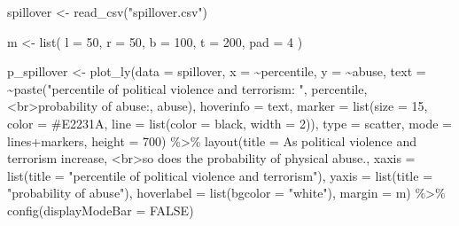 \documentclass[
  letterpaper,
  DIV=11,
  numbers=noendperiod]{scrartcl}
\newenvironment{Shaded}{\begin{snugshade}}{\end{snugshade}}
\newcommand{\AttributeTok}[1]{\textcolor[rgb]{0.40,0.45,0.13}{#1}}
\newcommand{\ConstantTok}[1]{\textcolor[rgb]{0.56,0.35,0.01}{#1}}
\newcommand{\DecValTok}[1]{\textcolor[rgb]{0.68,0.00,0.00}{#1}}
\newcommand{\FunctionTok}[1]{\textcolor[rgb]{0.28,0.35,0.67}{#1}}
\newcommand{\NormalTok}[1]{\textcolor[rgb]{0.00,0.23,0.31}{#1}}
\newcommand{\OtherTok}[1]{\textcolor[rgb]{0.00,0.23,0.31}{#1}}
\newcommand{\SpecialCharTok}[1]{\textcolor[rgb]{0.37,0.37,0.37}{#1}}
\newcommand{\StringTok}[1]{\textcolor[rgb]{0.13,0.47,0.30}{#1}}
\begin{document}
\protect{}\label{cr-results2}
\begin{Shaded}
\begin{Highlighting}[]
\NormalTok{spillover }\OtherTok{\textless{}{-}} \FunctionTok{read\_csv}\NormalTok{(}\StringTok{"spillover.csv"}\NormalTok{)}

\NormalTok{m }\OtherTok{\textless{}{-}} \FunctionTok{list}\NormalTok{(}
  \AttributeTok{l =} \DecValTok{50}\NormalTok{,}
  \AttributeTok{r =} \DecValTok{50}\NormalTok{,}
  \AttributeTok{b =} \DecValTok{100}\NormalTok{,}
  \AttributeTok{t =} \DecValTok{200}\NormalTok{,}
  \AttributeTok{pad =} \DecValTok{4}
\NormalTok{)}

\NormalTok{p\_spillover }\OtherTok{\textless{}{-}} \FunctionTok{plot\_ly}\NormalTok{(}\AttributeTok{data =}\NormalTok{ spillover, }
                       \AttributeTok{x =} \SpecialCharTok{\textasciitilde{}}\NormalTok{percentile, }
                       \AttributeTok{y =} \SpecialCharTok{\textasciitilde{}}\NormalTok{abuse, }
                       \AttributeTok{text =} \SpecialCharTok{\textasciitilde{}}\FunctionTok{paste}\NormalTok{(}\StringTok{"percentile of political violence and terrorism: "}\NormalTok{, }
\NormalTok{                                     percentile, }
                                     \StringTok{\textquotesingle{}\textless{}br\textgreater{}probability of abuse:\textquotesingle{}}\NormalTok{, }
\NormalTok{                                     abuse),}
                       \AttributeTok{hoverinfo =} \StringTok{\textquotesingle{}text\textquotesingle{}}\NormalTok{,}
                       \AttributeTok{marker =} \FunctionTok{list}\NormalTok{(}\AttributeTok{size =} \DecValTok{15}\NormalTok{,}
                                     \AttributeTok{color =} \StringTok{\textquotesingle{}\#E2231A\textquotesingle{}}\NormalTok{,}
                                     \AttributeTok{line =} \FunctionTok{list}\NormalTok{(}\AttributeTok{color =} \StringTok{\textquotesingle{}black\textquotesingle{}}\NormalTok{,}
                                                 \AttributeTok{width =} \DecValTok{2}\NormalTok{)),}
                       \AttributeTok{type =} \StringTok{\textquotesingle{}scatter\textquotesingle{}}\NormalTok{, }
                       \AttributeTok{mode =} \StringTok{\textquotesingle{}lines+markers\textquotesingle{}}\NormalTok{,}
                       \AttributeTok{height =} \DecValTok{700}\NormalTok{) }\SpecialCharTok{\%\textgreater{}\%}
  \FunctionTok{layout}\NormalTok{(}\AttributeTok{title =} \StringTok{\textquotesingle{}As political violence and terrorism increase, \textless{}br\textgreater{}so does the probability of physical abuse.\textquotesingle{}}\NormalTok{, }
         \AttributeTok{xaxis =} \FunctionTok{list}\NormalTok{(}\AttributeTok{title =} \StringTok{"percentile of political violence and terrorism"}\NormalTok{),}
         \AttributeTok{yaxis =} \FunctionTok{list}\NormalTok{(}\AttributeTok{title =} \StringTok{"probability of abuse"}\NormalTok{),}
         \AttributeTok{hoverlabel =} \FunctionTok{list}\NormalTok{(}\AttributeTok{bgcolor =} \StringTok{"white"}\NormalTok{),}
         \AttributeTok{margin =}\NormalTok{ m) }\SpecialCharTok{\%\textgreater{}\%} 
  \FunctionTok{config}\NormalTok{(}\AttributeTok{displayModeBar =} \ConstantTok{FALSE}\NormalTok{)}


\end{Highlighting}
\end{Shaded}
\end{document}
